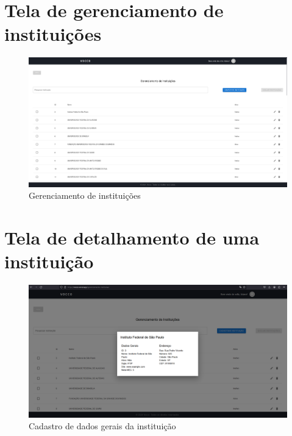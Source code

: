\begin{apendicesenv}
\section{Tela de gerenciamento de instituições}
\begin{figure}[H]
    \centering
    \includegraphics[width=1.0\linewidth]{images/gerenciamento.png}
    \caption{Gerenciamento de instituições}
    \label{fig:gerenciamento}
\end{figure}

\section{Tela de detalhamento de uma instituição}
\begin{figure}[H]
    \centering
    \includegraphics[width=1.0\linewidth]{images/informacoes.png}
    \caption{Cadastro de dados gerais da instituição}
    \label{fig:detalhamento}
\end{figure}


\end{apendicesenv}
